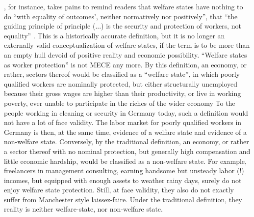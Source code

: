 \documentclass[11pt,a4paper,oneside,openright]{article}
\begin{document}
\begin{enumerate}
	\citeauthor{Offe2003}, for instance, takes pains to remind readers that welfare states have nothing to do ``with equality of outcomes', neither normatively nor positively'', that ``the guiding principle of principle (...) is the security and protection of workers, not equality'' \citeyearpar[450]{Offe2003}. 
	This is a historically accurate definition, but it is no longer an externally valid conceptualization of welfare states, if the term is to be more than an empty hull devoid of positive reality and economic possibility. 
	``Welfare states as worker protection'' is not \gls{MECE} any more. 
	By this definition, an economy, or rather, sectors thereof would be classified as a ``welfare state'', in which poorly qualified workers are nominally protected, but either structurally unemployed because their gross wages are higher than their productivity, or live in working poverty, ever unable to participate in the riches of the wider economy
	To the people working in cleaning or security in Germany today, such a definition would not have a lot of face validity. 
	The labor market for poorly qualified workers in Germany is then, at the same time, evidence of a welfare state and evidence of a non-welfare state. 
	Conversely, by the traditional definition, an economy, or rather a sector thereof with no nominal protection, but generally high compensation and little economic hardship, would be classified as a non-welfare state. 
	For example, freelancers in management consulting, earning handsome but unsteady labor (!) incomes, but equipped with enough assets to weather rainy days, surely do not enjoy welfare state protection. 
	Still, at face validity, they also do not exactly suffer from Manchester style laissez-faire. 
	Under the traditional definition, they reality is neither welfare-state, nor non-welfare state.
	

\end{enumerate}
\end{document}
